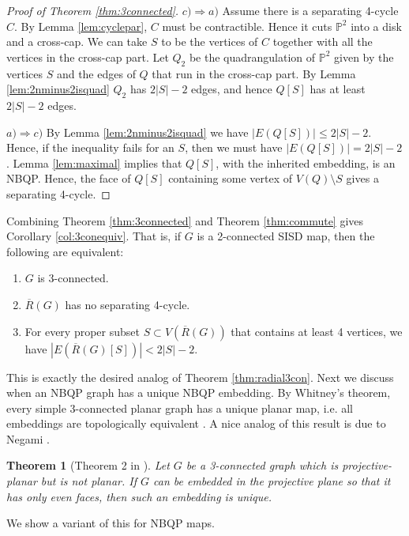 \documentclass{article}
\newtheorem{theorem}{Theorem}[section]
\newcommand{\Pb}[0]{\mathbb{P}}
\begin{document}
\begin{proof}[Proof of Theorem \ref{thm:3connected}]
    $c)\Rightarrow a)$ Assume there is a separating 4-cycle $C$. By Lemma \ref{lem:cyclepar}, $C$ must be contractible. Hence it cuts $\Pb^2$ into a disk and a cross-cap. We can take $S$ to be the vertices of $C$ together with all the vertices in the cross-cap part. Let $Q_2$ be the quadrangulation of $\Pb^2$ given by the vertices $S$ and the edges of $Q$ that run in the cross-cap part. By Lemma \ref{lem:2nminus2isquad}  $Q_2$  has $2|S|-2$ edges, and hence $Q[S]$ has at least $2|S|-2$ edges.

    $a)\Rightarrow c)$  By Lemma \ref{lem:2nminus2isquad} we have $|E(Q[S])|\le 2|S|-2$. Hence, if the inequality fails for an $S$, then we must have $|E(Q[S])|= 2|S|-2$. Lemma \ref{lem:maximal} implies that $Q[S]$, with the inherited embedding, is an NBQP. Hence, the face of $Q[S]$ containing some vertex of $V(Q)\setminus S$ gives a separating 4-cycle. 
    
\end{proof}



Combining Theorem \ref{thm:3connected} and Theorem \ref{thm:commute} gives Corollary \ref{col:3conequiv}. That is, if $G$ is a 2-connected SISD map, then the following are equivalent:
    \begin{enumerate}
        \item $G$ is 3-connected.
        \item $\overline R(G)$ has no separating 4-cycle.
        \item For every proper subset $S\subset V(\overline R(G))$ that contains at least 4 vertices, we have $|E(\overline R(G)[S])|< 2|S|-2$.
    \end{enumerate}

This is exactly the desired analog of Theorem \ref{thm:radial3con}. Next we discuss when an NBQP graph has a unique NBQP embedding. By Whitney’s theorem, every simple 3-connected planar graph has a unique planar map, i.e. all embeddings are topologically equivalent \cite{whitney19332}. A nice analog of this result is due to Negami \cite{NE92}.

\begin{theorem}[Theorem 2 in \cite{NE92}]
Let $G$ be a 3-connected graph which is projective-planar but is not planar. If $G$ can be embedded in the projective plane so that it has only even faces, then such an embedding is unique. 
\end{theorem}

We show a variant of this for NBQP maps. 
\end{document}

